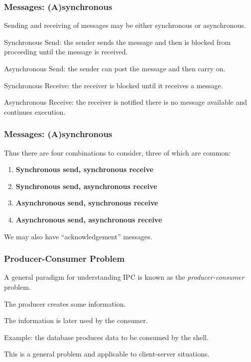 \begin{frame}
\frametitle{Messages: (A)synchronous}

Sending and receiving of messages may be either synchronous or asynchronous. 

Synchronous Send: the sender sends the message and then is blocked from proceeding until the message is received. 

Asynchronous Send: the sender can post the message and then carry on. 

Synchronous Receive: the receiver is blocked until it receives a message. 

Asynchronous Receive: the receiver is notified there is no message available and continues execution.

\end{frame}

\begin{frame}
\frametitle{Messages: (A)synchronous}

Thus there are four combinations to consider, three of which are common:

\begin{enumerate}
	\item \textbf{Synchronous send, synchronous receive} 
	\item \textbf{Synchronous send, asynchronous receive}
	\item \textbf{Asynchronous send, synchronous receive}
	\item \textbf{Asynchronous send, asynchronous receive}
\end{enumerate}

We may also have ``acknowledgement'' messages.

\end{frame}

\begin{frame}
\frametitle{Producer-Consumer Problem}

A general paradigm for understanding IPC is known as the \textit{producer-consumer} problem. 

The \alert{producer} creates some information.

The information is later used by the \alert{consumer}. 

Example: the database produces data to be consumed by the shell. 

This is a general problem and applicable to client-server situations.

\end{frame}

